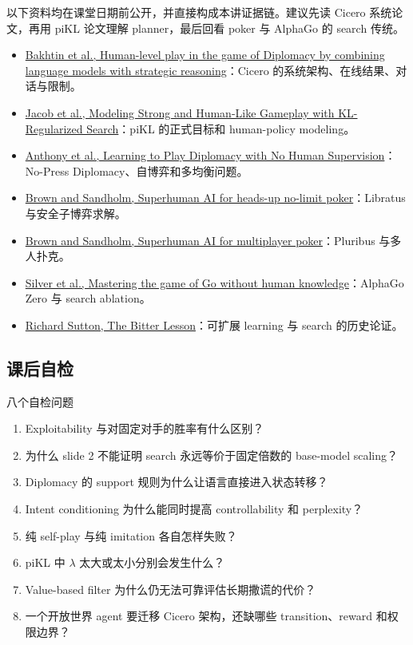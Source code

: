 \documentclass[a4paper]{article}
\begin{document}
以下资料均在课堂日期前公开，并直接构成本讲证据链。建议先读 Cicero 系统论文，再用 piKL 论文理解 planner，最后回看 poker 与 AlphaGo 的 search 传统。

\begin{itemize}
  \item \href{https://www.science.org/doi/full/10.1126/science.ade9097}{Bakhtin et al., Human-level play in the game of Diplomacy by combining language models with strategic reasoning}：Cicero 的系统架构、在线结果、对话与限制。
  \item \href{https://proceedings.mlr.press/v162/jacob22a.html}{Jacob et al., Modeling Strong and Human-Like Gameplay with KL-Regularized Search}：piKL 的正式目标和 human-policy modeling。
  \item \href{https://proceedings.neurips.cc/paper/2021/hash/95f2b84de5660ddf45c8a34933a2e66f-Abstract.html}{Anthony et al., Learning to Play Diplomacy with No Human Supervision}：No-Press Diplomacy、自博弈和多均衡问题。
  \item \href{https://www.science.org/doi/10.1126/science.aao1733}{Brown and Sandholm, Superhuman AI for heads-up no-limit poker}：Libratus 与安全子博弈求解。
  \item \href{https://www.science.org/doi/10.1126/science.aay2400}{Brown and Sandholm, Superhuman AI for multiplayer poker}：Pluribus 与多人扑克。
  \item \href{https://www.science.org/doi/10.1126/science.aar6404}{Silver et al., Mastering the game of Go without human knowledge}：AlphaGo Zero 与 search ablation。
  \item \href{http://www.incompleteideas.net/IncIdeas/BitterLesson.html}{Richard Sutton, The Bitter Lesson}：可扩展 learning 与 search 的历史论证。
\end{itemize}

\subsection{课后自检}

\begin{importantbox}{八个自检问题}
\begin{enumerate}
  \item Exploitability 与对固定对手的胜率有什么区别？
  \item 为什么 slide 2 不能证明 search 永远等价于固定倍数的 base-model scaling？
  \item Diplomacy 的 support 规则为什么让语言直接进入状态转移？
  \item Intent conditioning 为什么能同时提高 controllability 和 perplexity？
  \item 纯 self-play 与纯 imitation 各自怎样失败？
  \item piKL 中 $\lambda$ 太大或太小分别会发生什么？
  \item Value-based filter 为什么仍无法可靠评估长期撒谎的代价？
  \item 一个开放世界 agent 要迁移 Cicero 架构，还缺哪些 transition、reward 和权限边界？
\end{enumerate}
\end{importantbox}
\end{document}
